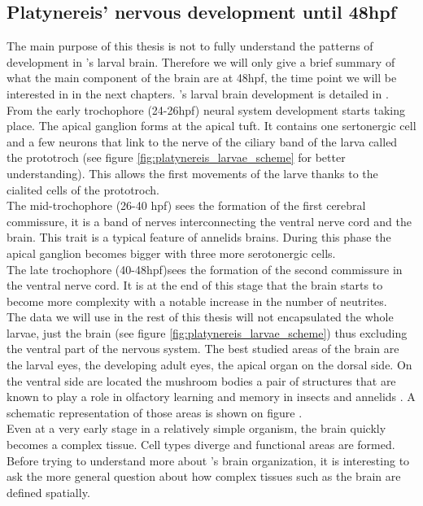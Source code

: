      \subsection{Platynereis' nervous development until 48hpf}
     The main purpose of this thesis is not to fully understand the patterns of development in \platy{}'s larval brain. Therefore we will only give a brief summary of what the main component of the brain are at 48hpf, the time point we will be interested in in the next chapters. \platy{}'s larval brain development is detailed in \cite{Fischer10}.\\
     From the early trochophore (24-26hpf) neural system development starts taking place. The apical ganglion forms at the apical tuft. It contains one sertonergic cell and a few neurons that link to the nerve of the ciliary band of the larva called the prototroch (see figure \ref{fig:platynereis_larvae_scheme} for better understanding). This allows the first movements of the larve thanks to the cialited cells of the prototroch.\\
     The mid-trochophore (26-40 hpf) sees the formation of the first cerebral commissure, it is a band of nerves interconnecting the ventral nerve cord and the brain. This trait is a typical feature of annelids brains. During this phase the apical ganglion becomes bigger with three more serotonergic cells.\\
     The late trochophore (40-48hpf)sees the formation of the second commissure in the ventral nerve cord. It is at the end of this stage that the brain starts to become more complexity with a notable increase in the number of neutrites.\\
     The data we will use in the rest of this thesis will not encapsulated the whole larvae, just the brain (see figure \ref{fig:platynereis_larvae_scheme}) thus excluding the ventral part of the nervous system. The best studied areas of the brain are the larval eyes, the developing adult eyes, the apical organ on the dorsal side. On the ventral side are located the mushroom bodies a pair of structures that are known to play a role in olfactory learning and memory in insects and annelids \cite{Tomer10}. A schematic representation of those areas is shown on figure .\\
     
     Even at a very early stage in a relatively simple organism, the brain quickly becomes a complex tissue. Cell types diverge and functional areas are formed. Before trying to understand more about \platy{}'s brain organization, it is interesting to ask the more general question about how complex tissues such as the brain are defined spatially.
     
